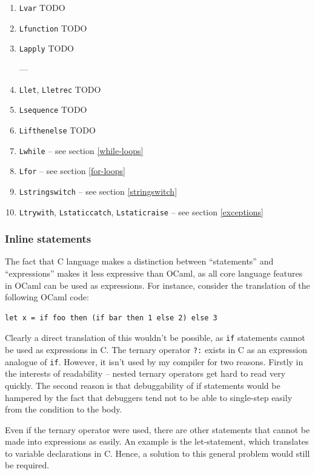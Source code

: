 \documentclass[12pt,a4paper,twoside,openright]{report}
\begin{document}
\begin{enumerate}
  \item \lstinline!Lvar! TODO
  \item \lstinline!Lfunction! TODO
  \item \lstinline!Lapply! TODO

    ---

  \item \lstinline!Llet!, \lstinline!Lletrec! TODO
  \item \lstinline!Lsequence! TODO
  \item \lstinline!Lifthenelse! TODO
  \item \lstinline!Lwhile! -- see section \ref{while-loops}
  \item \lstinline!Lfor! -- see section \ref{for-loops}
  \item \lstinline!Lstringswitch! -- see section \ref{stringswitch}
  \item \lstinline!Ltrywith!, \lstinline!Lstaticcatch!, \lstinline!Lstaticraise! -- see section \ref{exceptions}
\end{enumerate}

\subsubsection{Inline statements}\label{c-inline-statements}

The fact that C language makes a distinction between ``statements'' and
``expressions'' makes it less expressive than OCaml, as all core language
features in OCaml can be used as expressions. For instance, consider the
translation of the following OCaml code:

\begin{lstlisting}
let x = if foo then (if bar then 1 else 2) else 3
\end{lstlisting}

Clearly a direct translation of this wouldn't be possible, as \lstinline!if!
statements cannot be used as expressions in C. The ternary operator
\lstinline!?:! exists in C as an expression analogue of \lstinline!if!.
However, it isn't used by my compiler for two reasons.  Firstly in the
interests of readability -- nested ternary operators get hard to read very
quickly. The second reason is that debuggability of if statements would be
hampered by the fact that debuggers tend not to be able to single-step easily
from the condition to the body.

Even if the ternary operator were used, there are other statements that
cannot be made into expressions as easily. An example is the let-statement,
which translates to variable declarations in C. Hence, a solution to this
general problem would still be required.
\end{document}
